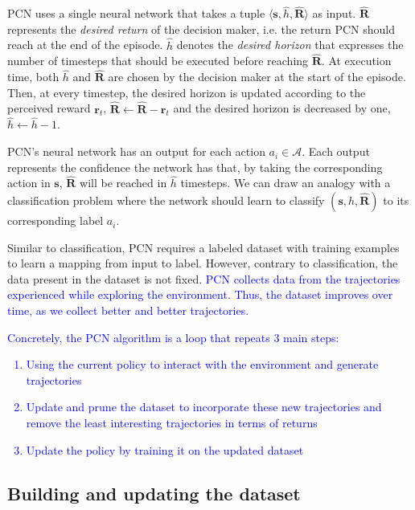 \documentclass{article}
\newcommand\added[1]{\textcolor{blue}{#1}}
\newcommand{\mdpstate}{\mathbf{s}}
\newcommand{\momdpreward}{\mathbf{r}}
\newcommand{\action}{a}
\begin{document}
PCN uses a single neural network that takes a tuple $\langle \mdpstate, \hat{h}, \mathbf{\hat{R}}  \rangle$ as input. $\mathbf{\hat{R}}$ represents the \emph{desired return} of the decision maker, i.e. the return PCN should reach at the end of the episode. $\hat{h}$ denotes the \emph{desired horizon} that expresses the number of timesteps that should be executed before reaching $\mathbf{\hat{R}}$. At execution time, both $\hat{h}$ and $\mathbf{\hat{R}}$ are chosen by the decision maker at the start of the episode. Then, at every timestep, the desired horizon is updated according to the perceived reward $\momdpreward_t$, $\mathbf{\hat{R}} \leftarrow \mathbf{\hat{R}} - \momdpreward_t$ and the desired horizon is decreased by one, $\hat{h} \leftarrow \hat{h}-1$.

PCN's neural network has an output for each action $\action_i \in \mathcal{A}$. Each output represents the confidence the network has that, by taking the corresponding action in $\mdpstate$, $\mathbf{\hat{R}}$ will be reached in $\hat{h}$ timesteps. We can draw an analogy with a classification problem where the network should learn to classify $(\mdpstate, \hat{h}, \mathbf{\hat{R}})$ to its corresponding label $\action_i$.

Similar to classification, PCN requires a labeled dataset with training examples to learn a mapping from input to label. However, contrary to classification, the data present in the dataset is not fixed. \added{PCN collects data from the trajectories experienced while exploring the environment. Thus, the dataset improves over time, as we collect better and better trajectories.}

\added{Concretely, the PCN algorithm is a loop that repeats 3 main steps:
\begin{enumerate}
    \item Using the current policy to interact with the environment and generate trajectories
    \item Update and prune the dataset to incorporate these new trajectories and remove the least interesting trajectories in terms of returns
    \item Update the policy by training it on the updated dataset
\end{enumerate}
}

\subsection{Building and updating the dataset}
\label{sec:pcn-building-dataset}
\end{document}
